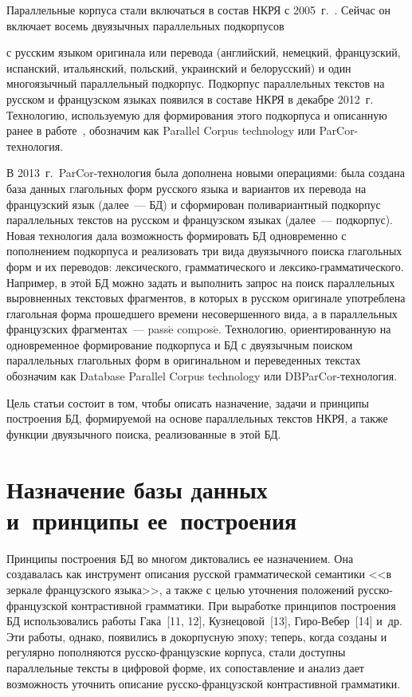 \begin{multicols}{2}
 Параллельные корпуса стали включаться в состав НКРЯ с 2005~г.~\cite{zat-2,
zat-4, zat-9, zat-10}. Сейчас он включает восемь двуязычных параллельных
подкорпусов\linebreak\vspace*{-12pt}

\pagebreak

\noindent
 с русским языком оригинала или перевода
(английский, немецкий, французский, испанский, италь\-ян\-ский, польский,
украинский и белорусский) и один многоязычный параллельный подкорпус.
Подкорпус параллельных текстов на русском и французском языках появился в
составе НКРЯ в декабре 2012~г. Технологию, используемую для формирования
этого подкорпуса и описанную ранее в работе~\cite{zat-8}, обозначим как
Parallel Corpus technology или ParCor-технология.

  В 2013~г.\ ParCor-технология была дополнена новыми операциями: была
создана база данных глагольных форм русского языка и вариантов их перевода
на французский язык (далее~--- БД) и сформирован поливариантный подкорпус
параллельных текстов на русском и французском языках (далее~--- подкорпус).
Новая технология дала возможность формировать БД одновременно с
пополнением подкорпуса и реализовать три вида двуязычного поиска
глагольных форм и их переводов: лексического, грамматического и
лек\-си\-ко-грам\-ма\-ти\-че\-ско\-го. Например, в этой БД можно задать и
выполнить запрос на поиск параллельных выровненных текстовых фрагментов,
в которых в русском оригинале употреблена глагольная форма прошедшего
времени несовершенного вида, а в параллельных французских фрагментах~---
pass$\acute{\mbox{e}}$ compos$\acute{\mbox{e}}$. Технологию,
ориентированную на одновременное формирование подкорпуса и БД с
двуязычным поиском параллельных глагольных форм в оригинальном и
переведенных текстах обозначим как Database Parallel Corpus technology или
DBParCor-технология.

  Цель статьи состоит в том, чтобы описать назначение, задачи и принципы
построения БД, формируемой на основе параллельных текстов НКРЯ, а также
функции двуязычного поиска, реализованные в этой БД.

\vspace*{-9pt}

\section{Назначение базы данных и~принципы ее~построения} %

  Принципы построения БД во многом диктовались ее назначением. Она
создавалась как инст\-румент описания русской грамматической семантики <<в
зеркале французского языка>>, а также с целью уточнения положений
рус\-ско-фран\-цуз\-ской контрастивной грамматики. При выработке принципов
построения БД использовались работы Гака~[11, 12], Кузнецовой~[13],
Гиро-Вебер~[14] и~др. Эти работы, однако, появились в докорпусную
эпоху; теперь, когда созданы и регулярно пополняются
рус\-ско-фран\-цуз\-ские корпуса, стали доступны параллельные тексты в
цифровой форме, их со\-по\-ставление и анализ дает возможность уточнить
описание рус\-ско-фран\-цуз\-ской контрастивной грам\-ма\-тики.


\end{multicols}
